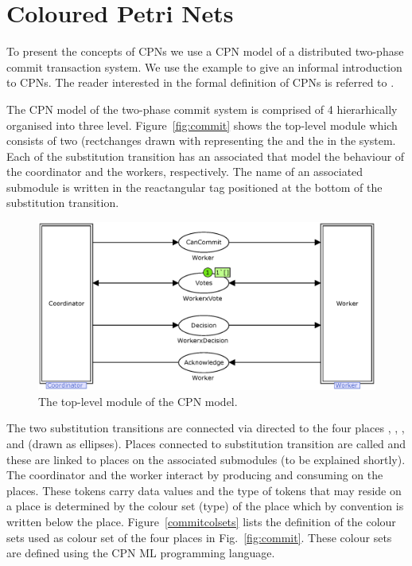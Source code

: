 \section{Coloured Petri Nets}

To present the concepts of CPNs we use a CPN model of a distributed
two-phase commit transaction system. We use the example to give an
informal introduction to CPNs. The reader interested in the formal
definition of CPNs is referred to \cite{X}.


The CPN model of the two-phase commit system is comprised of 4
 hierarhically organised into three
level. Figure~\ref{fig:commit} shows the top-level module which
consists of two  (rectchanges drawn
with  representing the  and
the  in the system. Each of the substitution
transition has an associated  that model the
behaviour of the coordinator and the workers, respectively. The name
of an associated submodule is written in the reactangular tag
positioned at the bottom of the substitution transition. 

\begin{figure}[t]
\centering
\includegraphics[scale=.5]{figures/Commit.eps}
\caption{The top-level module of the CPN model.}
\end{figure}


The two substitution transitions are connected via directed
 to the four places ,
, , and  (drawn
as ellipses). Places connected to substitution transition are called
 and these are linked to  places
on the associated submodules (to be explained shortly). The
coordinator and the worker interact by producing and consuming
 on the places. These tokens carry data values and the
type of tokens that may reside on a place is determined by the colour
set (type) of the place which by convention is written below the
place. Figure~\ref{commitcolsets} lists the definition of the colour
sets used as colour set of the four places in
Fig.~\ref{fig:commit}. These colour sets are defined using the CPN ML
programming language.

